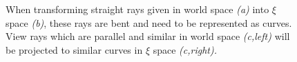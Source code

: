 \documentclass[journal]{vgtc}                %
\begin{document}
\begin{figure}[t]
    \centering
    \caption{When transforming straight rays given in world space {\it (a)} into $\xi$ space {\it (b)}, these rays are bent and need to be represented as curves. View rays which are parallel and similar in world space {\it (c,left)} will be projected to similar curves in $\xi$ space \it{(c,right)}.}
    \label{fig:raycoords}
\end{figure}
\end{document}
